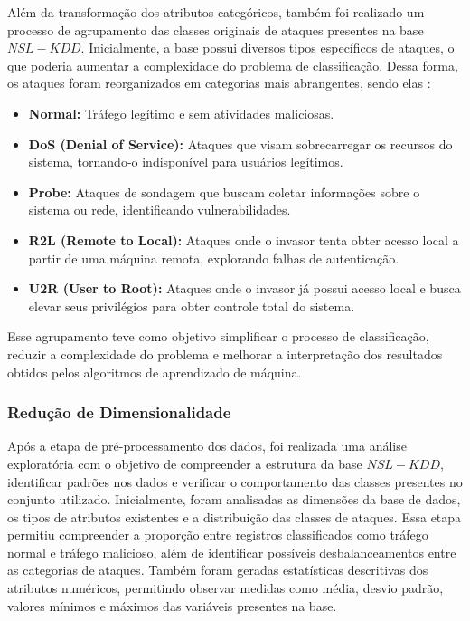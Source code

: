 \documentclass[a4paper,10pt, twocolumn]{article}
\begin{document}
Além da transformação dos atributos categóricos, também foi realizado um processo 
de agrupamento das classes originais de ataques presentes na base $NSL-KDD$. 
Inicialmente, a base possui diversos tipos específicos de ataques, o que poderia 
aumentar a complexidade do problema de classificação. Dessa forma, os ataques 
foram reorganizados em categorias mais abrangentes, sendo elas \cite{Belavagi2016Performance} \cite{Jabez2015Intrusion}: 
\begin{itemize}
	\item \textbf{Normal:} Tráfego legítimo e sem atividades maliciosas.
	\item \textbf{DoS (Denial of Service):} Ataques que visam sobrecarregar os recursos do sistema, tornando-o indisponível para usuários legítimos.
	\item \textbf{Probe:} Ataques de sondagem que buscam coletar informações sobre o sistema ou rede, identificando vulnerabilidades.
	\item \textbf{R2L (Remote to Local):} Ataques onde o invasor tenta obter acesso local a partir de uma máquina remota, explorando falhas de autenticação.
	\item \textbf{U2R (User to Root):} Ataques onde o invasor já possui acesso local e busca elevar seus privilégios para obter controle total do sistema.
\end{itemize}
Esse agrupamento teve como objetivo simplificar o processo de classificação, 
reduzir a complexidade do problema e melhorar a interpretação dos resultados 
obtidos pelos algoritmos de aprendizado de máquina.

\subsubsection{Redução de Dimensionalidade}
Após a etapa de pré-processamento dos dados, foi realizada uma análise exploratória 
com o objetivo de compreender a estrutura da base $NSL-KDD$, identificar padrões 
nos dados e verificar o comportamento das classes presentes no conjunto 
utilizado. Inicialmente, foram analisadas as dimensões da base de dados, os 
tipos de atributos existentes e a distribuição das classes de ataques. Essa 
etapa permitiu compreender a proporção entre registros classificados como 
tráfego normal e tráfego malicioso, além de identificar possíveis desbalanceamentos 
entre as categorias de ataques. Também foram geradas estatísticas descritivas 
dos atributos numéricos, permitindo observar medidas como média, desvio padrão, 
valores mínimos e máximos das variáveis presentes na base.
\end{document}
